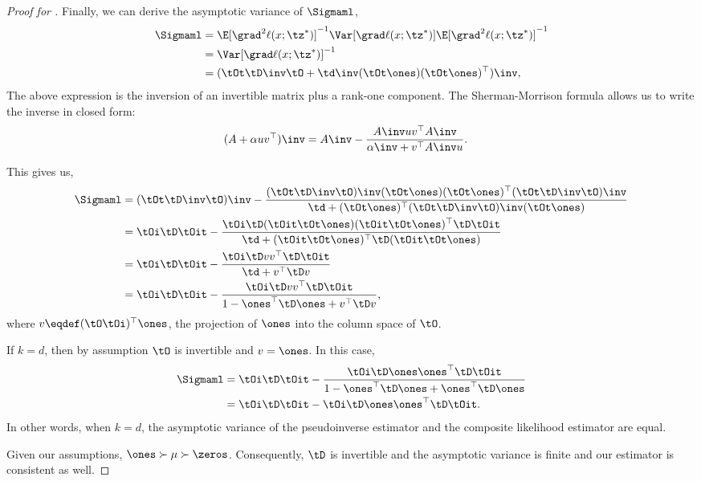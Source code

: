 \begin{proof}[Proof for ]
Finally, we can derive the asymptotic variance of $\Sigmaml$,
\begin{align*}
    \Sigmaml &= \E[\grad^2 \ell(x ; \tz^*)]^{-1} \Var[\grad \ell(x ; \tz^*)] \E[\grad^2 \ell(x ; \tz^*)]^{-1} \\
      &= \Var[\grad \ell(x;\tz^*)]^{-1} \\
      &= (\tOt \tD\inv \tO + \td\inv (\tOt \ones)(\tOt \ones)^\top)\inv,
\end{align*}
The above expression is the inversion of an invertible matrix plus
a rank-one component. The Sherman-Morrison formula allows us to write
the inverse in closed form:
\begin{align*}
  (A + \alpha uv^\top)\inv &= A\inv - \frac{A\inv uv^\top A\inv}{\alpha\inv + v^\top A\inv u}.
\end{align*}

This gives us,
\begin{align}
    \Sigmaml
    &= (\tOt \tD\inv \tO)\inv
      - \frac{
      (\tOt \tD\inv \tO)\inv (\tOt \ones) (\tOt \ones)^\top (\tOt \tD\inv \tO)\inv }
      {\td + (\tOt \ones)^\top (\tOt \tD\inv \tO)\inv (\tOt \ones)} \nonumber \\
    &= \tOi \tD \tOit 
      - \frac{\tOi \tD (\tOit \tOt \ones) (\tOit \tOt \ones)^\top  \tD \tOit }
      {\td + (\tOit \tOt \ones)^\top \tD (\tOit \tOt \ones)} \nonumber \\
    &= \tOi \tD \tOit 
      - \frac{\tOi \tD v v^\top \tD \tOit }
      {\td + v^\top \tD v} \nonumber \\
    &= \tOi \tD \tOit 
      - \frac{\tOi \tD v v^\top \tD \tOit }
      {1 - \ones^\top \tD \ones + v^\top \tD v }, \label{eqn:asymp-var-ml}
\end{align}
where $v \eqdef (\tO \tOi)^\top \ones$, the projection of $\ones$ into the
column space of $\tO$. 

If $k = d$, then by assumption $\tO$ is invertible and $v = \ones$. In this case,
\begin{align*}
    \Sigmaml
    &= \tOi \tD \tOit 
      - \frac{\tOi \tD \ones \ones^\top \tD \tOit }
      {1 - \ones^\top \tD \ones + \ones^\top \tD \ones } \\
    &= \tOi \tD \tOit 
      - \tOi \tD \ones \ones^\top \tD \tOit.
\end{align*}
In other words, when $k = d$, the asymptotic variance of the
pseudoinverse estimator and the composite likelihood estimator are
equal.

Given our assumptions, $\ones \succ \mu \succ \zeros$. Consequently,
$\tD$ is invertible and the asymptotic variance is finite and our
estimator is consistent as well. 
\end{proof}

